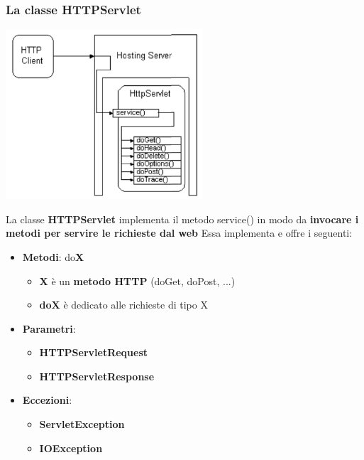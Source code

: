 \documentclass[12pt]{article}
\begin{document}
\subsubsection{La classe HTTPServlet}
\begin{center}
    \includegraphics[width = 0.55\textwidth]{Images/184.png}
\end{center}
La classe \textbf{HTTPServlet} implementa il metodo service() in modo da \textbf{invocare i metodi per servire le richieste dal web}
Essa implementa e offre i seguenti:
\begin{itemize}
    \item \textbf{Metodi}: do\textbf{X}
    \begin{itemize}
        \item \textbf{X} è un \textbf{metodo HTTP} (doGet, doPost, ...)
        \item \textbf{doX} è dedicato alle richieste di tipo X
    \end{itemize}
    \item \textbf{Parametri}:
    \begin{itemize}
        \item \textbf{HTTPServletRequest}
        \item \textbf{HTTPServletResponse}
    \end{itemize}
    \item \textbf{Eccezioni}:
    \begin{itemize}
        \item \textbf{ServletException}
        \item \textbf{IOException}
    \end{itemize}
\end{itemize}
\end{document}
